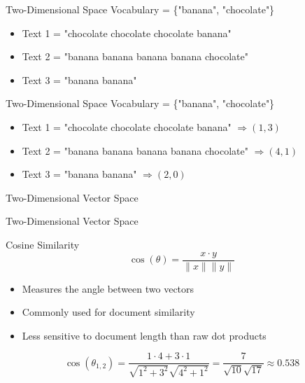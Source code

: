 \documentclass[11pt,aspectratio=43]{beamer}
\begin{document}
\begin{frame}{Two-Dimensional Space}
Vocabulary = \{"banana", "chocolate"\}
\begin{itemize}
\item Text 1 = "chocolate chocolate chocolate banana"
\item Text 2 = "banana banana banana banana chocolate"
\item Text 3 = "banana banana"
\end{itemize}
\end{frame}

\begin{frame}{Two-Dimensional Space}
Vocabulary = \{"banana", "chocolate"\}
\begin{itemize}
\item Text 1 = "chocolate chocolate chocolate banana" $\Rightarrow(1,3)$
\item Text 2 = "banana banana banana banana chocolate" $\Rightarrow(4,1)$
\item Text 3 = "banana banana" $\Rightarrow(2,0)$
\end{itemize}
\end{frame}

\begin{frame}{Two-Dimensional Vector Space}
\centering
{}
\end{frame}

\begin{frame}{Two-Dimensional Vector Space}
\centering
{}
\end{frame}

\begin{frame}{Cosine Similarity}
\[
\cos(\theta)=\frac{x\cdot y}{\lVert x\rVert\lVert y\rVert}
\]
\begin{itemize}
\item Measures the angle between two vectors
\item Commonly used for document similarity
\item Less sensitive to document length than raw dot products
\end{itemize}
\[
\cos(\theta_{1,2})=
\frac{1\cdot4+3\cdot1}{\sqrt{1^2+3^2}\sqrt{4^2+1^2}}
=\frac7{\sqrt{10}\sqrt{17}}\approx0.538
\]
\end{frame}
\end{document}
